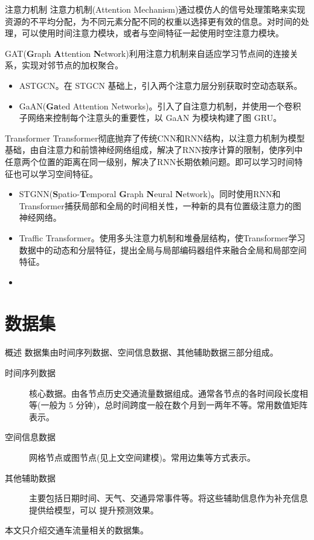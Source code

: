 \documentclass{libs/format}
\begin{document}
\begin{frame}{注意力机制}
  注意力机制(Attention Mechanism)通过模仿人的信号处理策略来实现资源的不平均分配，为不同元素分配不同的权重以选择更有效的信息\cite{T-ZS26}。对时间的处理，可以使用时间注意力模块，或者与空间特征一起使用时空注意力模块。
  
  GAT(\textbf{G}raph \textbf{A}ttention \textbf{N}etwork)利用注意力机制来自适应学习节点间的连接关系，实现对邻节点的加权聚合。

  \begin{itemize}
    \item ASTGCN\cite{T-81}。在 STGCN 基础上，引入两个注意力层分别获取时空动态联系。
    \item GaAN(\textbf{Ga}ted Attention Networks)\cite{T-88}。引入了自注意力机制，并使用一个卷积子网络来控制每个注意头的重要性，以 GaAN 为模块构建了图 GRU。
  \end{itemize}
\end{frame}

\begin{frame}{Transformer}
  Transformer彻底抛弃了传统CNN和RNN结构，以注意力机制为模型基础，由自注意力和前馈神经网络组成，解决了RNN按序计算的限制，使序列中任意两个位置的距离在同一级别，解决了RNN长期依赖问题。\cite{T-ZS6}即可以学习时间特征也可以学习空间特征。

  \begin{itemize}
    \item STGNN(\textbf{S}patio-\textbf{T}emporal \textbf{G}raph \textbf{N}eural \textbf{N}etwork)\cite{T-173}。同时使用RNN和Transformer捕获局部和全局的时间相关性，一种新的具有位置级注意力的图神经网络。
    \item Traffic Transformer\cite{T-202}。使用多头注意力机制和堆叠层结构，使Transformer学习数据中的动态和分层特征，提出全局与局部编码器组件来融合全局和局部空间特征。
    \item 
  \end{itemize}
\end{frame}

\section{数据集}

\begin{frame}{概述}
  数据集由时间序列数据、空间信息数据、其他辅助数据三部分组成。
  \begin{description}
    \item[时间序列数据] 核心数据。由各节点历史交通流量数据组成。通常各节点的各时间段长度相等(一般为 $5$ 分钟)，总时间跨度一般在数个月到一两年不等。常用数值矩阵表示。
    \item[空间信息数据] 网格节点或图节点(见上文空间建模)。常用边集等方式表示。
    \item[其他辅助数据] 主要包括日期时间、天气、交通异常事件等。将这些辅助信息作为补充信息提供给模型，可以
    提升预测效果。
  \end{description}
  本文只介绍交通车流量相关的数据集。
\end{frame}
\end{document}
